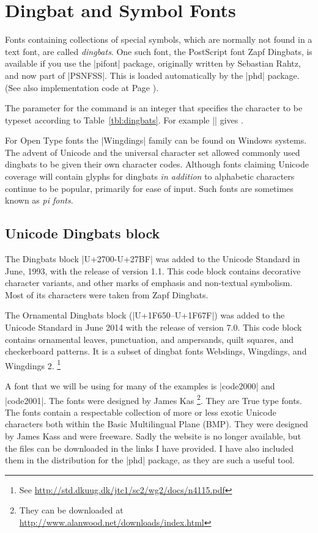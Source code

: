 \section{Dingbat and Symbol Fonts}

Fonts containing collections of special symbols, which are normally not found in a text font, are called  \textit{dingbats}. One such font, the PostScript font Zapf Dingbats, is available if you use the |pifont| package, originally written by Sebastian Rahtz, and now part of |PSNFSS|. This is loaded automatically by the |phd| package. (See also implementation code at Page \pageref{dingbats}).

The parameter for the  command is an integer that specifies the character to be typeset according to Table~\ref{tbl:dingbats}. For example || gives .

For Open Type fonts the |Wingdings| family can be found on Windows systems. The advent of Unicode and the universal character set allowed commonly used dingbats to be given their own character codes. Although fonts claiming Unicode coverage will contain glyphs for dingbats \textit{in addition} to alphabetic characters continue to be popular, primarily for ease of input. Such fonts are sometimes known as \textit{pi fonts}.

\subsection{Unicode Dingbats block}

The Dingbats block |U+2700-U+27BF| was added to the Unicode Standard in June, 1993, with the release of version 1.1. This code block  contains decorative character variants, and other marks of emphasis and non-textual symbolism. Most of its characters were taken from Zapf Dingbats. 

The Ornamental Dingbats block (|U+1F650–U+1F67F|) was added to the Unicode Standard in June 2014 with the release of version 7.0. This code block contains ornamental leaves, punctuation, and ampersands, quilt squares, and checkerboard patterns. It is a subset of dingbat fonts Webdings, Wingdings, and Wingdings 2. \footnote{See \url{http://std.dkuug.dk/jtc1/sc2/wg2/docs/n4115.pdf}}

A font that we will be using for many of the \XeLaTeX examples is |code2000|
and |code2001|. The fonts were designed by James Kas
\footnote{They can be downloaded at \url{http://www.alanwood.net/downloads/index.html}}. They are True type fonts. The fonts contain a respectable collection of more or less exotic Unicode characters both within the Basic Multilingual Plane (BMP). They were designed by James Kass and were freeware. Sadly the website is no longer available, but the files can be downloaded in the links I have provided. I have also included them in the distribution for the |phd| package, as they are such a useful tool.

